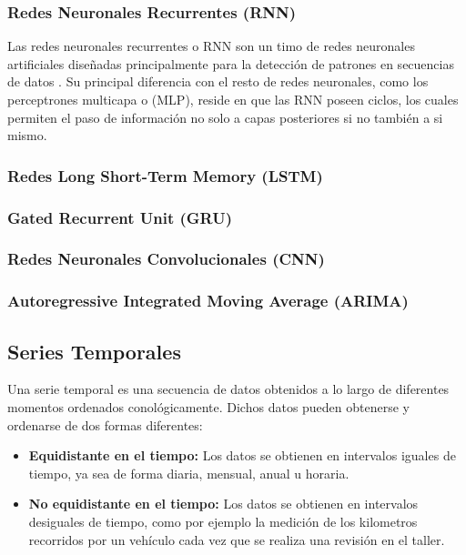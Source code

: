 \documentclass[a4paper,12pt]{article}
\begin{document}
\subsubsection{Redes Neuronales Recurrentes (RNN)}

Las redes neuronales recurrentes o RNN son un timo de redes neuronales 
artificiales diseñadas principalmente para la detección de patrones
en secuencias de datos \cite{RNN}. Su principal diferencia con el resto de redes
neuronales, como los perceptrones multicapa o (MLP), reside en que
las RNN poseen ciclos, los cuales permiten el paso de información
no solo a capas posteriores si no también a si mismo.

\subsubsection{Redes Long Short-Term Memory (LSTM)}

\subsubsection{Gated Recurrent Unit (GRU)}

\subsubsection{Redes Neuronales Convolucionales (CNN)}

\subsubsection{Autoregressive Integrated Moving Average (ARIMA)}


\subsection{Series Temporales}

Una serie temporal es una secuencia de datos obtenidos
a lo largo de diferentes momentos ordenados conológicamente.
Dichos datos pueden obtenerse y ordenarse de dos formas diferentes:

\begin{itemize}
    \item \textbf{Equidistante en el tiempo:} Los datos se 
    obtienen en intervalos iguales de tiempo, ya sea de forma
    diaria, mensual, anual u horaria.

    \item \textbf{No equidistante en el tiempo:} Los datos 
    se obtienen en intervalos desiguales de tiempo, como 
    por ejemplo la medición de los kilometros recorridos por 
    un vehículo cada vez que se realiza una revisión en el 
    taller.
\end{itemize}
\end{document}
